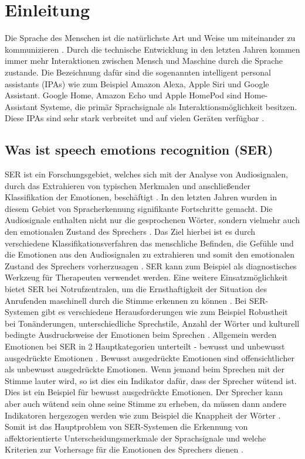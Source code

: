 \chapter{Einleitung}

Die Sprache des Menschen ist die natürlichste Art und Weise um miteinander zu kommunizieren \cite{spectrogram}. Durch die technische Entwicklung in den letzten Jahren kommen immer mehr Interaktionen zwischen Mensch und Maschine durch die Sprache zustande. Die Bezeichnung dafür sind die sogenannten intelligent personal assistants (IPAs) \cite{badshah2019deep} wie zum Beispiel Amazon Alexa, Apple Siri und Google Assistant. Google Home, Amazon Echo und Apple HomePod sind Home-Assistant Systeme, die primär Sprachsignale als Interaktionsmöglichkeit besitzen. Diese IPAs sind sehr stark verbreitet und auf vielen Geräten verfügbar \cite{speech_in_hci}.


\section{Was ist speech emotions recognition (SER)}
SER ist ein Forschungsgebiet, welches sich mit der Analyse von Audiosignalen, durch das Extrahieren von typischen Merkmalen und anschließender Klassifikation der Emotionen, beschäftigt \cite{spectrogram}. In den letzten Jahren wurden in diesem Gebiet von Spracherkennung signifikante Fortschritte gemacht. Die Audiosignale enthalten nicht nur die gesprochenen Wörter, sondern vielmehr auch den emotionalen Zustand des Sprechers \cite{badshah2019deep,speech_in_hci}. Das Ziel hierbei ist es durch verschiedene Klassifikationsverfahren das menschliche Befinden, die Gefühle und die Emotionen aus den Audiosignalen zu extrahieren und somit den emotionalen Zustand des Sprechers vorherzusagen \cite{spectrogram}. SER kann zum Beispiel als diagnostisches Werkzeug für Therapeuten verwendet werden. Eine weitere Einsatzmöglichkeit bietet SER bei Notrufzentralen, um die Ernsthaftigkeit der Situation des Anrufenden maschinell durch die Stimme erkennen zu können \cite{badshah2019deep}. Bei SER-Systemen gibt es verschiedene Herausforderungen wie zum Beispiel  Robustheit bei Tonänderungen, unterschiedliche Sprechstile, Anzahl der Wörter und kulturell bedingte Ausdrucksweise der Emotionen beim Sprechen \cite{spectrogram}. Allgemein werden Emotionen bei SER in 2 Hauptkategorien unterteilt - bewusst und unbewusst ausgedrückte Emotionen \cite{elearning}. Bewusst ausgedrückte Emotionen sind offensichtlicher als unbewusst ausgedrückte Emotionen. Wenn jemand beim Sprechen mit der Stimme lauter wird, so ist dies ein Indikator dafür, dass der Sprecher wütend ist. Dies ist ein Beispiel für bewusst ausgedrückte Emotionen. Der Sprecher kann aber auch wütend sein ohne seine Stimme zu erheben, da müssen dann andere Indikatoren hergezogen werden wie zum Beispiel die Knappheit der Wörter \cite{elearning}. Somit ist das Hauptproblem von SER-Systemen die Erkennung von affektorientierte Unterscheidungsmerkmale der Sprachsignale und welche Kriterien zur Vorhersage für die Emotionen des Sprechers dienen \cite{badshah2019deep}.

